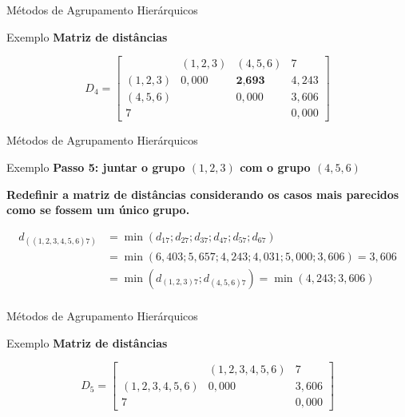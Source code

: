 \documentclass[
  ignorenonframetext,
  aspectratio=169,
]{beamer}
\begin{document}
\begin{frame}{Métodos de Agrupamento Hierárquicos}
\protect{}\label{muxe9todos-de-agrupamento-hieruxe1rquicos-27}
\begin{block}{Exemplo}
\protect{}\label{exemplo-16}
\textbf{Matriz de distâncias}

\[D_4 = \left[ \begin{matrix}
&(1,2,3) &(4,5,6) &7\\ 
(1,2,3)& 0,000 & \textbf{2,693} &  4,243 \\
(4,5,6)    &  & 0,000 &  3,606 \\
7  &       &  & 0,000
                    \end{matrix} \right]\]
\end{block}
\end{frame}

\begin{frame}{Métodos de Agrupamento Hierárquicos}
\protect{}\label{muxe9todos-de-agrupamento-hieruxe1rquicos-28}
\begin{block}{Exemplo}
\protect{}\label{exemplo-17}
\textbf{Passo 5: juntar o grupo \((1,2,3)\) com o grupo \((4,5,6)\)}

\textbf{Redefinir a matriz de distâncias considerando os casos mais
parecidos como se fossem um único grupo.}

\[
\begin{aligned}
d_{((1,2,3,4,5,6)7)} &=  \min(d_{17};d_{27};d_{37};d_{47};d_{57};d_{67}) \\ 
&= \min(6,403; 5,657; 4,243; 4,031; 5,000; 3,606) = 3,606 \\ &= 
\min(d_{(1,2,3)7};d_{(4,5,6)7}) = \min(4,243; 3,606) \\
\end{aligned}
\]
\end{block}
\end{frame}

\begin{frame}{Métodos de Agrupamento Hierárquicos}
\protect{}\label{muxe9todos-de-agrupamento-hieruxe1rquicos-29}
\begin{block}{Exemplo}
\protect{}\label{exemplo-18}
\textbf{Matriz de distâncias}

\[D_5 = \left[ \begin{matrix}
&(1,2,3,4,5,6) & 7\\ 
(1,2,3,4,5,6 )& 0,000 & 3,606 \\
7         &  & 0,000
                    \end{matrix} \right]\]
\end{block}
\end{frame}
\end{document}
